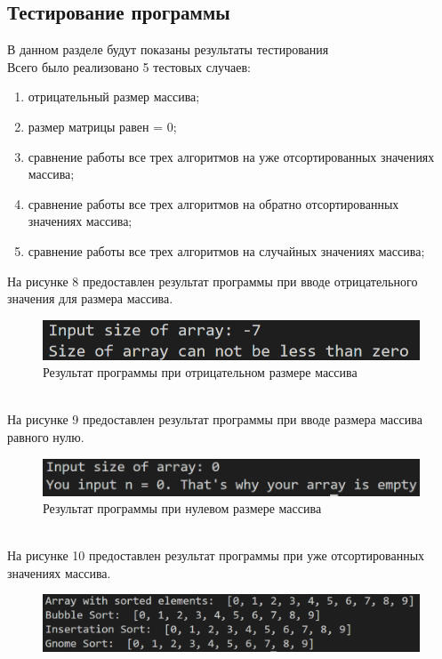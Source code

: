 \documentclass[a4paper, 12pt]{article}
\begin{document}
\begin{flushleft}
	\subsection{Тестирование программы}
	В данном разделе будут показаны результаты тестирования
	\\ \hspace*{5mm} Всего было реализовано 5 тестовых случаев:
	\begin{enumerate}
		\item отрицательный размер массива;
		\item размер матрицы равен = 0;
		\item сравнение работы все трех алгоритмов на уже отсортированных значениях массива;
		\item сравнение работы все трех алгоритмов на обратно отсортированных значениях массива;
		\item сравнение работы все трех алгоритмов на случайных значениях массива;
	\end{enumerate}
	\clearpage
	\newpage
	\hspace*{5mm} На рисунке 8 предоставлен результат программы при вводе отрицательного значения для размера массива.
	\begin{figure}[h]
		\centering \includegraphics[scale=1.2]{zero}
		\centering\caption{Результат программы при отрицательном размере массива}
	\end{figure}
	\\ \hspace*{5mm} На рисунке 9 предоставлен результат программы при вводе размера массива равного нулю.
	\begin{figure}[h]
		\includegraphics[scale=1.2]{less}
		\centering\caption{Результат программы при нулевом размере массива}
	\end{figure}
	\\ \hspace*{5mm} На рисунке 10 предоставлен результат программы при уже отсортированных значениях массива.
	\begin{figure}[h]
		\centering \includegraphics[scale=1.2]{sorted_test}

\end{figure}
\end{flushleft}
\end{document}
